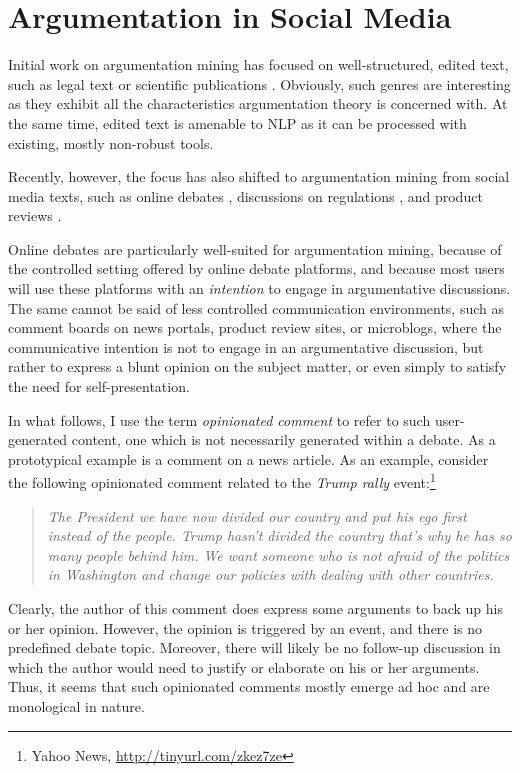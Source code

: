 \documentclass[11pt]{article}
\begin{document}
\section{Argumentation in Social Media}

Initial work on argumentation mining has focused on well-structured, edited
text, such as legal text \cite{walton2005argumentation} or scientific
publications \cite{jimenez2007argumentation}. Obviously, such genres are
interesting as they exhibit all the characteristics argumentation theory is
concerned with. At the same time, edited text is amenable to NLP as it can be
processed with existing, mostly non-robust tools.

Recently, however, the focus has also shifted to argumentation mining from
social media texts,  such as online debates
\cite{cabrio2012combining,habernal2014argumentation,boltuzic2014back},
discussions on regulations \cite{park2014identifying}, and product reviews
\cite{ghosh2014analyzing}.

Online debates are particularly well-suited for argumentation mining, because
of the controlled setting offered by online debate platforms, and because most
users will use these platforms with an \emph{intention} to engage in
argumentative discussions. The same cannot be said of less controlled
communication environments, such as comment boards on news portals, product
review sites, or microblogs, where the communicative intention is not to engage
in an argumentative discussion, but rather to express a blunt opinion on the
subject matter, or even simply to satisfy the need for self-presentation.

In what follows, I use the term \emph{opinionated comment} to refer to such
user-generated content, one which is not necessarily generated within a debate.
As a prototypical example is a comment on a news article. As an example,
consider the following opinionated comment related to the \emph{Trump rally}
event:\footnote{Yahoo News, \url{http://tinyurl.com/zkez7ze}}

\begin{quote}
\emph{%
The President we have now divided our country and put his ego first instead of the people. Trump hasn't divided the country that's why he has so many people behind him. We want someone who is not afraid of the politics in Washington and change our policies with dealing with other countries.}
\end{quote}

Clearly, the author of this comment does express some arguments to back up his or
her opinion. However, the opinion is triggered by an event, and there is no
predefined debate topic. Moreover, there will likely be no follow-up discussion
in which the author would need to justify or elaborate on his or her arguments.
Thus, it seems that such opinionated comments mostly emerge ad hoc and are
monological in nature. 
\end{document}
